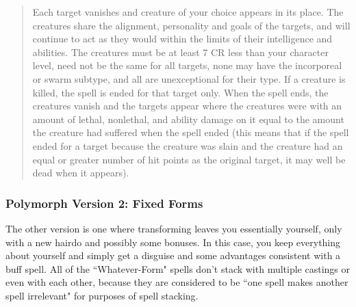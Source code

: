 \begin{quote}
\begin{small}
\end{small}

Each target vanishes and creature of your choice appears in its place. The creatures share the alignment, personality and goals of the targets, and will continue to act as they would within the limits of their intelligence and abilities. The creatures must be at least 7 CR less than your character level, need not be the same for all targets, none may have the incorporeal or swarm subtype, and all are unexceptional for their type. If a creature is killed, the spell is ended for that target only. When the spell ends, the creatures vanish and the targets appear where the creatures were with an amount of lethal, nonlethal, and ability damage on it equal to the amount the creature had suffered when the spell ended (this means that if the spell ended for a target because the creature was slain and the creature had an equal or greater number of hit points as the original target, it may well be dead when it appears).

\end{quote}

\subsubsection{Polymorph Version 2: Fixed Forms}

The other version is one where transforming leaves you essentially yourself, only with a new hairdo and possibly some bonuses. In this case, you keep everything about yourself and simply get a disguise and some advantages consistent with a buff spell. All of the ``Whatever-Form" spells don't stack with multiple castings or even with each other, because they are considered to be ``one spell makes another spell irrelevant" for purposes of spell stacking.


